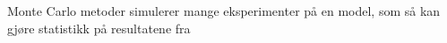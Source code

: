 \documentclass[presentation]{beamer}
\begin{document}
\begin{frame}{Monte Carlo metoder simulerer mange eksperimenter på en model, som så kan gjøre statistikk på resultatene fra}
   \vspace{-5mm}
\begin{figure}

\end{figure}
\end{frame}
\end{document}

